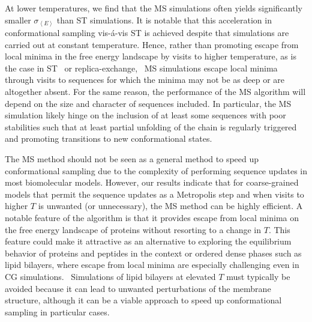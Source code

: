 \documentclass[%
 aip,
rsi,%
 amsmath,amssymb,
 reprint,%
]{revtex4-1}
\newcommand {\sigE}	{{\sigma_{\left < E \right >}}}
\begin{document}
At lower temperatures, we find that the MS simulations often yields significantly smaller $\sigE$ than ST simulations. It is notable that this acceleration in conformational sampling vis-{\'a}-vis ST is achieved despite that simulations are carried out at constant temperature. Hence, rather than promoting escape from local minima in the free energy landscape by visits to higher temperature, as is the case in  ST~\cite{Marinari1992,Lyubartsev1992} or replica-exchange,~\cite{Swendsen1986}  MS simulations escape local minima through visits to sequences for which the minima may not be as deep or are altogether absent. For the same reason, the performance of the MS algorithm will depend on the size and character of sequences included. In particular, the MS simulation likely hinge on the inclusion of at least some sequences with poor stabilities such that at least partial unfolding of the chain is regularly triggered and promoting transitions to new conformational states. 

The MS method should not be seen as a general method to speed up conformational sampling due to the complexity of performing sequence updates in most biomolecular models. However, our results indicate that for coarse-grained models that permit the sequence updates as a Metropolis step and when visits to higher $T$ is unwanted (or unnecessary), the MS method can be highly efficient. A notable feature of the algorithm is that it provides escape from local minima on the free energy landscape of proteins without resorting to a change in $T$. This feature could make it attractive as an alternative to exploring the equilibrium behavior of proteins and peptides in the context or ordered dense phases such as lipid bilayers, where escape from local minima are especially challenging even in CG simulations.~\cite{Bereau2015} Simulations of lipid bilayers at elevated $T$ must typically be avoided because it can lead to unwanted perturbations of the membrane structure, although it can be a viable approach to speed up conformational sampling in particular cases.~\cite{Ulmschneider2010} 

\end{document}

